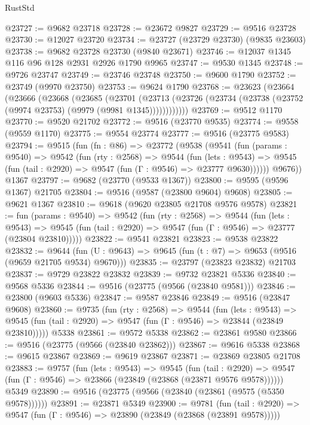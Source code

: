 \begin{lexlean}{RustStd}
\begin{coremodule}
@23727 := @9682 @23718
@23728 := @23672 @9827
@23729 := @9516 @23728
@23730 := @12027 @23720
@23734 := @23727 (@23729 @23730) (@9835 @23603)
@23738 := @9682 @23728 @23730 (@9840 @23671)
@23746 := @12037 @1345 @116 @96 @128 @2931 @2926 @1790 @9965
@23747 := @9530 @1345
@23748 := @9726 @23747
@23749 := @23746 @23748
@23750 := @9600 @1790
@23752 := @23749 (@9970 @23750)
@23753 := @9624 @1790
@23768 := @23623
    (@23664
      (@23666
        (@23668
          (@23685
            (@23701
              (@23713 (@23726 (@23734 (@23738 (@23752 (@9974 @23753) (@9979 (@9981 @1345))))))))))))
@23769 := @9512 @1170
@23770 := @9520 @21702
@23772 := @9516 (@23770 @9535)
@23774 := @9558 (@9559 @1170)
@23775 := @9554 @23774
@23777 := @9516 (@23775 @9583)
@23794 := @9515
    (fun (fn : @86) =>
    @23772
      (@9538
        (@9541
          (fun (params : @9540) =>
          @9542
            (fun (rty : @2568) =>
            @9544
              (fun (lets : @9543) =>
              @9545 (fun (tail : @2920) => @9547 (fun (Γ : @9546) => @23777 @9630))))))
        @9676))
    @1367
@23797 := @9682 (@23770 (@9533 @1367))
@23800 := @9595 (@9596 @1367) @21705
@23804 := @9516 (@9587 (@23800 @9604) @9608)
@23805 := @9621 @1367
@23810 := @9618 (@9620 @23805 @21708 @9576 @9578)
@23821 := fun (params : @9540) =>
  @9542
    (fun (rty : @2568) =>
    @9544
      (fun (lets : @9543) =>
      @9545 (fun (tail : @2920) => @9547 (fun (Γ : @9546) => @23777 (@23804 @23810)))))
@23822 := @9541 @23821
@23823 := @9538 @23822
@23832 := @9644
    (fun (U : @9643) => @9645 (fun (t : @7) => @9653 (@9516 (@9659 @21705 @9534) @9670)))
@23835 := @23797 (@23823 @23832) @21703
@23837 := @9729 @23822 @23832
@23839 := @9732 @23821 @5336
@23840 := @9568 @5336
@23844 := @9516 (@23775 (@9566 (@23840 @9581)))
@23846 := @23800 (@9603 @5336)
@23847 := @9587 @23846
@23849 := @9516 (@23847 @9608)
@23860 := @9735
    (fun (rty : @2568) =>
    @9544
      (fun (lets : @9543) =>
      @9545 (fun (tail : @2920) => @9547 (fun (Γ : @9546) => @23844 (@23849 @23810)))))
    @5338
@23861 := @9572 @5338
@23862 := @23861 @9580
@23866 := @9516 (@23775 (@9566 (@23840 @23862)))
@23867 := @9616 @5338
@23868 := @9615 @23867
@23869 := @9619 @23867
@23871 := @23869 @23805 @21708
@23883 := @9757
    (fun (lets : @9543) =>
    @9545
      (fun (tail : @2920) =>
      @9547 (fun (Γ : @9546) => @23866 (@23849 (@23868 (@23871 @9576 @9578))))))
    @5349
@23890 := @9516 (@23775 (@9566 (@23840 (@23861 (@9575 (@5350 @9578))))))
@23891 := @23871 @5349
@23900 := @9781
    (fun (tail : @2920) => @9547 (fun (Γ : @9546) => @23890 (@23849 (@23868 (@23891 @9578)))))

\end{coremodule}
\end{lexlean}
